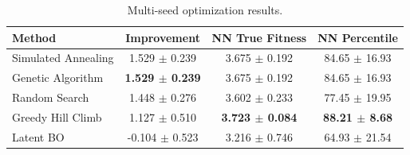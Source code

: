 \begin{table}[t]
\centering
\small
\begin{tabular}{lccc}
\hline
\textbf{Method} & \textbf{Improvement} & \textbf{NN True Fitness} & \textbf{NN Percentile} \\
\hline
Simulated Annealing & 1.529 $\pm$ 0.239 & 3.675 $\pm$ 0.192 & 84.65 $\pm$ 16.93 \\
Genetic Algorithm & \textbf{1.529 $\pm$ 0.239} & 3.675 $\pm$ 0.192 & 84.65 $\pm$ 16.93 \\
Random Search & 1.448 $\pm$ 0.276 & 3.602 $\pm$ 0.233 & 77.45 $\pm$ 19.95 \\
Greedy Hill Climb & 1.127 $\pm$ 0.510 & \textbf{3.723 $\pm$ 0.084} & \textbf{88.21 $\pm$ 8.68} \\
Latent BO & -0.104 $\pm$ 0.523 & 3.216 $\pm$ 0.746 & 64.93 $\pm$ 21.54 \\
\hline
\end{tabular}
\caption{Multi-seed optimization results.}
\label{tab:optimization}
\end{table}